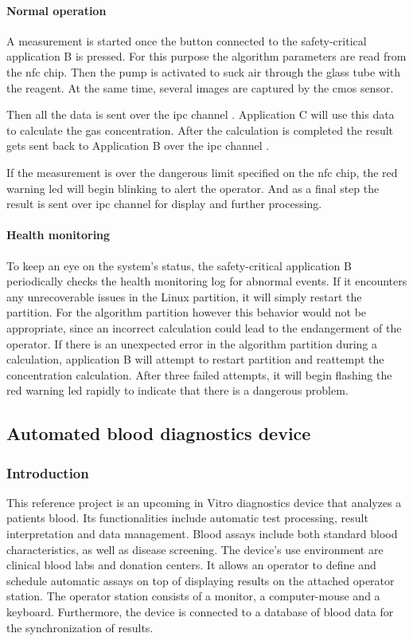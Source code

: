 \paragraph{Normal operation}


A measurement is started once the button connected to the safety-critical application B is pressed. For this purpose the algorithm parameters are read from the \acrshort{nfc} chip. Then the pump is activated to suck air through the glass tube with the reagent. At the same time, several images are captured by the \acrshort{cmos} sensor.

Then all the data is sent over the \acrshort{ipc} channel \bToc. Application C will use this data to calculate the gas concentration. After the calculation is completed the result gets sent back to Application B over the \acrshort{ipc} channel \cTob.

If the measurement is over the dangerous limit specified on the \acrshort{nfc} chip, the red warning \acrshort{led} will begin blinking to alert the operator. And as a final step the result is sent over \acrshort{ipc} channel \bToa for display and further processing.

\paragraph{Health monitoring}
To keep an eye on the system's status, the safety-critical application B periodically checks the health monitoring log for abnormal events. If it encounters any unrecoverable issues in the Linux partition, it will simply restart the partition. 
For the algorithm partition however this behavior would not be appropriate, since an incorrect calculation could lead to the endangerment of the operator. If there is an unexpected error in the algorithm partition during a calculation, application B will attempt to restart partition and reattempt the concentration calculation. After three failed attempts, it will begin flashing the red warning \acrshort{led} rapidly to indicate that there is a dangerous problem.

\subsection{Automated blood diagnostics device}
\subsubsection{Introduction}
This reference project is an upcoming in Vitro diagnostics device that analyzes a patients blood. Its functionalities include automatic test processing, result interpretation and data management. Blood assays include both standard blood characteristics, as well as disease screening.
The device's use environment are clinical blood labs and donation centers. It allows an operator to define and schedule automatic assays on top of displaying results on the attached operator station. The operator station consists of a monitor, a computer-mouse and a keyboard. Furthermore, the device is connected to a database of blood data for the synchronization of results.

